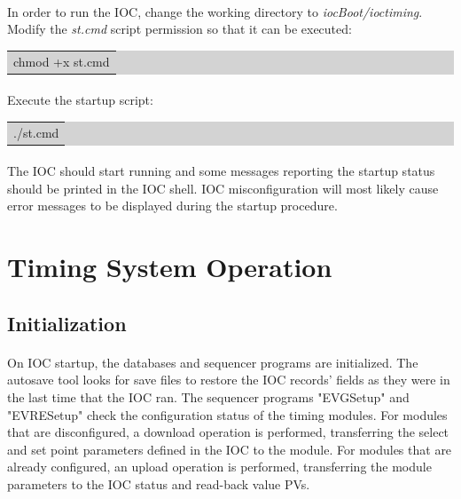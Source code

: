 \documentclass[openany]{article}
\begin{document}
		\paragraph{} In order to run the IOC, change the working directory to \emph{iocBoot/ioctiming}. Modify the \emph{st.cmd} script permission so that it can be executed:

		\bigskip
		\colorbox{lightgray}{
			\begin{tabularx}{0.9\textwidth}{X}
			chmod +x st.cmd \\
			\end{tabularx}
		}

		\paragraph{} Execute the startup script:

		\bigskip
		\colorbox{lightgray}{
			\begin{tabularx}{0.9\textwidth}{X}
			./st.cmd \\
			\end{tabularx}
		}

		\paragraph{} The IOC should start running and some messages reporting the startup status should be printed in the IOC shell. IOC misconfiguration will most likely cause error messages to be displayed during the startup procedure.

\section{Timing System Operation}\label{sec:system-operation}

	\subsection{Initialization}
		\paragraph{} On IOC startup, the databases and sequencer programs are initialized. The autosave tool looks for save files to restore the IOC records' fields as they were in the last time that the IOC ran. The sequencer programs "EVGSetup" and "EVRESetup" check the configuration status of the timing modules. For modules that are disconfigured, a download operation is performed, transferring the select and set point parameters defined in the IOC to the module. For modules that are already configured, an upload operation is performed, transferring the module parameters to the IOC status and read-back value PVs.
\end{document}
